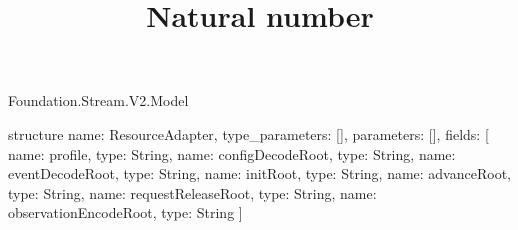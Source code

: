 \begin{lexlean}{Foundation.Stream.V2.Model}
\title{Natural number}
\begin{semanticmodule}
structure{
  name: ResourceAdapter,
  type_parameters: [],
  parameters: [],
  fields: [
    {name: profile, type: String},
    {name: configDecodeRoot, type: String},
    {name: eventDecodeRoot, type: String},
    {name: initRoot, type: String},
    {name: advanceRoot, type: String},
    {name: requestReleaseRoot, type: String},
    {name: observationEncodeRoot, type: String}
  ]
}
\end{semanticmodule}
\end{lexlean}
